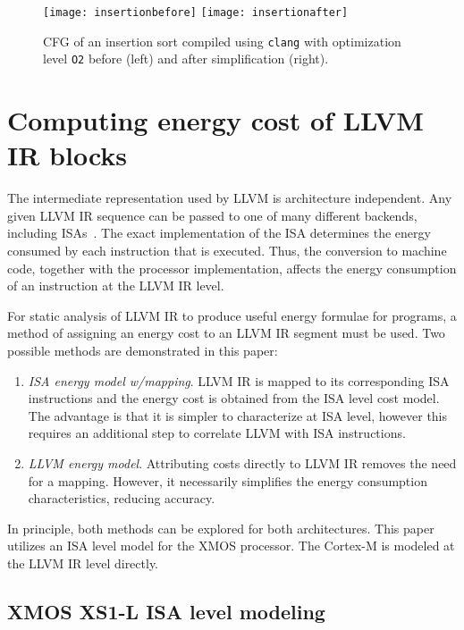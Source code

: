 \documentclass[9pt,preprint]{sigplanconf}
\newcommand{\figlabel}[1]{\label{fig:#1}}
\begin{document}
\begin{figure}
\begin{center}
\texttt{[image: insertionbefore]}
\texttt{[image: insertionafter]}
\end{center}
\caption{\figlabel{insertioncfgbefore}\figlabel{insertioncfgafter}
CFG of an insertion sort compiled using \texttt{clang} with optimization
  level \texttt{O2} before (left) and after simplification (right).}
\end{figure}


\section{Computing energy cost of LLVM IR blocks}

The intermediate representation used by LLVM is architecture independent. Any
given LLVM IR sequence can be passed to one of many different backends,
including ISAs~\cite{LLVM-backend}.  The exact implementation of the ISA
determines the energy consumed by each instruction that is executed.  Thus, the
conversion to machine code, together with the processor implementation, affects
the energy consumption of an instruction at the LLVM IR level.

For static analysis of LLVM IR to produce useful energy formulae for programs, a
method of assigning an energy cost to an LLVM IR segment must be used. Two
possible methods are demonstrated in this paper:
\begin{enumerate}
  \item \emph{ISA energy model w/mapping}. LLVM IR is mapped to its corresponding
    ISA instructions and the energy cost is obtained from the ISA level cost
    model. The advantage is that it is simpler to characterize at ISA level, however this requires an additional step to correlate
    LLVM with ISA instructions.
  \item \emph{LLVM energy model}. Attributing costs directly to LLVM IR removes
    the need for a mapping. However, it necessarily simplifies the energy
    consumption characteristics, reducing accuracy.
\end{enumerate}

In principle, both methods can be explored for both architectures. This paper
utilizes an ISA level model for the XMOS processor. The Cortex-M is
modeled at the LLVM IR level directly.

\subsection{XMOS XS1-L ISA level modeling}
\label{sec:xs1model}
\end{document}
